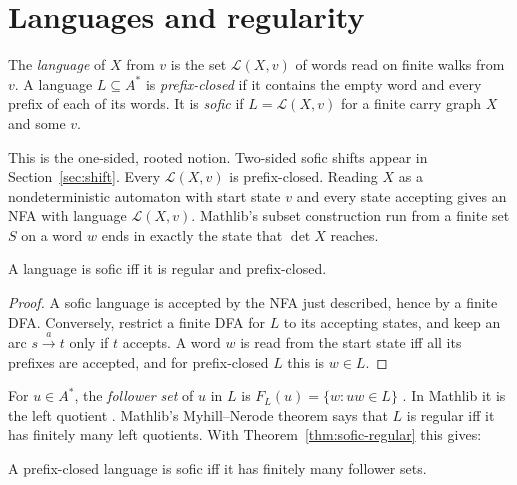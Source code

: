 \section{Languages and regularity}

\begin{definition}\label{def:sofic}
The \emph{language} of \(X\) from \(v\) is the set \(\mathcal L(X,v)\) of words read on finite
walks from \(v\). A language \(L\subseteq A^*\) is \emph{prefix-closed} if it contains the empty
word and every prefix of each of its words. It is \emph{sofic} if \(L=\mathcal L(X,v)\) for a
finite carry graph \(X\) and some \(v\).
\end{definition}

This is the one-sided, rooted notion. Two-sided sofic shifts appear in
Section~\ref{sec:shift}. Every \(\mathcal L(X,v)\) is prefix-closed. Reading \(X\) as a
nondeterministic automaton with start state \(v\) and every state accepting gives an NFA with
language \(\mathcal L(X,v)\). Mathlib's subset construction  run from a finite
set \(S\) on a word \(w\) ends in exactly the state that \(\det X\) reaches.

\begin{theorem}\label{thm:sofic-regular}
A language is sofic iff it is regular and prefix-closed.
\end{theorem}

\begin{proof}
A sofic language is accepted by the NFA just described, hence by a finite DFA. Conversely,
restrict a finite DFA for \(L\) to its accepting states, and keep an arc \(s\xrightarrow{a}t\)
only if \(t\) accepts. A word \(w\) is read from the start state iff all its prefixes are
accepted, and for prefix-closed \(L\) this is \(w\in L\).
\end{proof}

For \(u\in A^*\), the \emph{follower set} of \(u\) in \(L\) is
\(F_L(u)=\{w : uw\in L\}\) \cite[Def.~3.2.4]{LM95}. In Mathlib it is the left quotient
. Mathlib's Myhill--Nerode theorem says that \(L\) is regular iff it has
finitely many left quotients. With Theorem~\ref{thm:sofic-regular} this gives:

\begin{corollary}\label{cor:sofic-follower}
A prefix-closed language is sofic iff it has finitely many follower sets.
\end{corollary}

